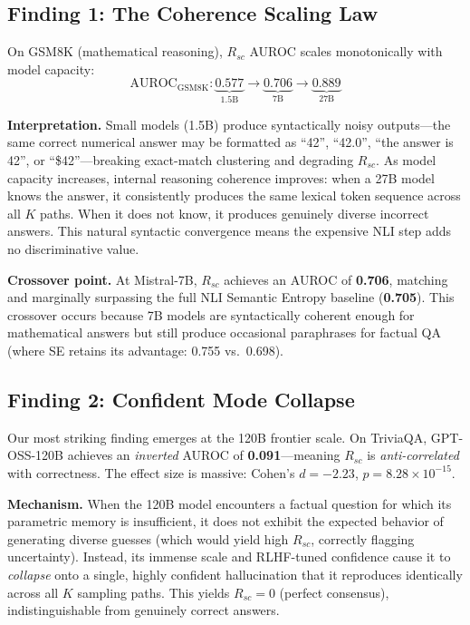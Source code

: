 \documentclass[11pt]{article}
\begin{document}
\subsection{Finding 1: The Coherence Scaling Law}

On GSM8K (mathematical reasoning), $R_{sc}$ AUROC scales monotonically with model capacity:
\begin{equation}
    \text{AUROC}_{\text{GSM8K}}: \underbrace{0.577}_{\text{1.5B}} \longrightarrow \underbrace{0.706}_{\text{7B}} \longrightarrow \underbrace{0.889}_{\text{27B}}
    \label{eq:scaling}
\end{equation}

\textbf{Interpretation.} Small models (1.5B) produce syntactically noisy outputs---the same correct numerical answer may be formatted as ``42'', ``42.0'', ``the answer is 42'', or ``\$42''---breaking exact-match clustering and degrading $R_{sc}$. As model capacity increases, internal reasoning coherence improves: when a 27B model knows the answer, it consistently produces the same lexical token sequence across all $K$ paths. When it does not know, it produces genuinely diverse incorrect answers. This natural syntactic convergence means the expensive NLI step adds no discriminative value.

\textbf{Crossover point.} At Mistral-7B, $R_{sc}$ achieves an AUROC of \textbf{0.706}, matching and marginally surpassing the full NLI Semantic Entropy baseline (\textbf{0.705}). This crossover occurs because 7B models are syntactically coherent enough for mathematical answers but still produce occasional paraphrases for factual QA (where SE retains its advantage: 0.755 vs.\ 0.698).

\subsection{Finding 2: Confident Mode Collapse}
\label{sec:mode_collapse}

Our most striking finding emerges at the 120B frontier scale. On TriviaQA, GPT-OSS-120B achieves an \textit{inverted} AUROC of \textbf{0.091}---meaning $R_{sc}$ is \textit{anti-correlated} with correctness. The effect size is massive: Cohen's $d = -2.23$, $p = 8.28 \times 10^{-15}$.

\textbf{Mechanism.} When the 120B model encounters a factual question for which its parametric memory is insufficient, it does not exhibit the expected behavior of generating diverse guesses (which would yield high $R_{sc}$, correctly flagging uncertainty). Instead, its immense scale and RLHF-tuned confidence cause it to \textit{collapse} onto a single, highly confident hallucination that it reproduces identically across all $K$ sampling paths. This yields $R_{sc} = 0$ (perfect consensus), indistinguishable from genuinely correct answers.
\end{document}
